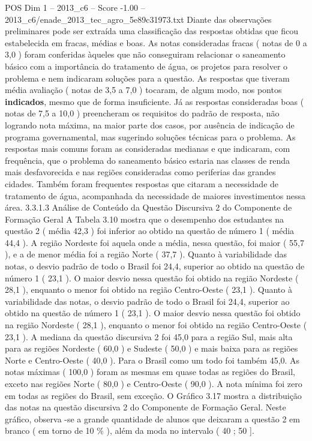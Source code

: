 \begin{textsample}{POS Dim 1 – 2013\_c6 – Score -1.00 – 2013\_c6/enade\_2013\_tec\_agro\_5e89c31973.txt}
Diante das observações preliminares pode ser extraída uma classificação das respostas obtidas que ficou estabelecida em fracas, médias e boas.
As notas consideradas fracas ( notas de 0 a 3,0 ) foram conferidas àqueles que não conseguiram relacionar o saneamento básico com a importância do tratamento de água, os projetos para resolver o problema e nem indicaram soluções para a questão.
As respostas que tiveram média avaliação ( notas de 3,5 a 7,0 ) tocaram, de algum modo, nos pontos \textbf{indicados}, mesmo que de forma insuficiente.
Já as respostas consideradas boas ( notas de 7,5 a 10,0 ) preencheram os requisitos do padrão de resposta, não logrando nota máxima, na maior parte dos casos, por ausência de indicação de programa governamental, mas sugerindo soluções técnicas para o problema.
As respostas mais comuns foram as consideradas medianas e que indicaram, com frequência, que o problema do saneamento básico estaria nas classes de renda mais desfavorecida e nas regiões consideradas como periferias das grandes cidades.
Também foram frequentes respostas que citaram a necessidade de tratamento de água, acompanhada da necessidade de maiores investimentos nessa área. 3.3.1.3 Análise de Conteúdo da Questão Discursiva 2 do Componente de Formação Geral A Tabela 3.10 mostra que o desempenho dos estudantes na questão 2 ( média 42,3 ) foi inferior ao obtido na questão de número 1 ( média 44,4 ).
A região Nordeste foi aquela onde a média, nessa questão, foi maior ( 55,7 ), e a de menor média foi a região Norte ( 37,7 ).
Quanto à variabilidade das notas, o desvio padrão de todo o Brasil foi 24,4, superior ao obtido na questão de número 1 ( 23,1 ).
O maior desvio nessa questão foi obtido na região Nordeste ( 28,1 ), enquanto o menor foi obtido na região Centro-Oeste ( 23,1 ).
Quanto à variabilidade das notas, o desvio padrão de todo o Brasil foi 24,4, superior ao obtido na questão de número 1 ( 23,1 ).
O maior desvio nessa questão foi obtido na região Nordeste ( 28,1 ), enquanto o menor foi obtido na região Centro-Oeste ( 23,1 ).
A mediana da questão discursiva 2 foi 45,0 para a região Sul, mais alta para as regiões Nordeste ( 60,0 ) e Sudeste ( 50,0 ) e mais baixa para as regiões Norte e Centro-Oeste ( 40,0 ).
Para o Brasil como um todo foi também 45,0.
As notas máximas ( 100,0 ) foram as mesmas em quase todas as regiões do Brasil, exceto nas regiões Norte ( 80,0 ) e Centro-Oeste ( 90,0 ).
A nota mínima foi zero em todas as regiões do Brasil, sem exceção.
O Gráfico 3.17 mostra a distribuição das notas na questão discursiva 2 do Componente de Formação Geral.
Neste gráfico, observa -se a grande quantidade de alunos que deixaram a questão 2 em branco ( em torno de 10 \% ), além da moda no intervalo ( 40 ; 50 ].

\end{textsample}
